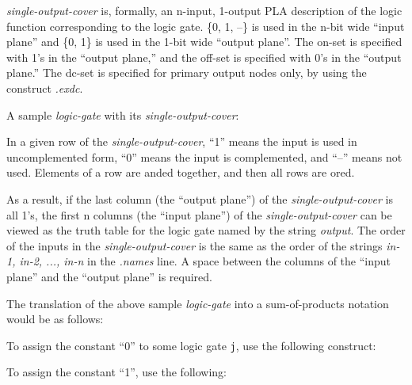 {\begin{pespace}
\begin{description}
\item {\em single-output-cover} is, formally, an n-input, 1-output PLA
description of the logic function corresponding to the logic gate.  \{0, 1,
--\} is used in the n-bit wide ``input plane'' and \{0, 1\} is used in
the 1-bit wide ``output plane''.  The {\sc on}-set is specified with 1's in
the ``output plane,'' and the {\sc off}-set is specified with 0's in the
``output plane.''
The {\sc dc}-set is specified for primary output nodes only,
by using the construct {\em .exdc}.
\end{description}

A sample {\em logic-gate} with its {\em single-output-cover}:

In a given row of the {\em single-output-cover}, ``1'' means the input is
used in uncomplemented form, ``0'' means the input is complemented, and
``--'' means not used.  Elements of a row are {\sc and}ed together, and then
all rows are {\sc or}ed.  

As a result, if the last column (the ``output plane'') of the {\em
single-output-cover} is all 1's, the first n columns (the ``input plane'')
of the {\em single-output-cover} can be viewed as the truth table for the
logic gate named by the string {\em output}.  The order of the inputs in the
{\em single-output-cover} is the same as the order of the strings {\em in-1,
in-2, ..., in-n} in the {\em .names} line.  A space between the columns of
the ``input plane'' and the ``output plane'' is required.

The translation of the above sample {\em logic-gate} into a sum-of-products
notation would be as follows:
To assign the constant ``0'' to some logic gate {\verb|j|}, use the
following construct:
To assign the constant ``1'', use the following:


\end{pespace}}
